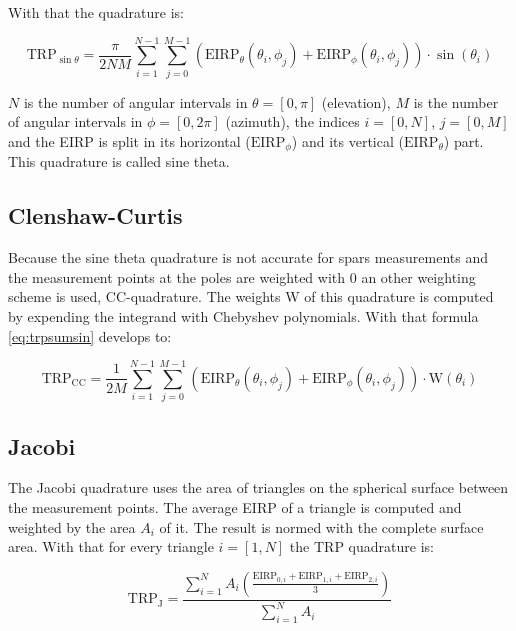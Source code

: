 With that the quadrature is:

\begin{equation}
\text{TRP}_{\sin\theta} = \frac{\pi}{2NM}\sum^{N-1}_{i=1}\sum^{M-1}_{j=0}\left(\text{EIRP}_\theta\left(\theta_i,\phi_j\right)+\text{EIRP}_\phi\left(\theta_i,\phi_j\right)\right)\cdot\sin\left(\theta_i\right)
\label{eq:trpsumsin}
\end{equation}

$N$ is the number of angular intervals in $\theta=\left[0,\pi\right]$ (elevation), $M$ is the number of angular intervals in $\phi=\left[0,2\pi\right]$ (azimuth), the indices $i=\left[0,N\right]$, $j=\left[0,M\right]$ and the \ac{EIRP} is split in its horizontal ($\text{EIRP}_\phi$) and its vertical ($\text{EIRP}_\theta$) part. This quadrature is called sine theta.

\subsection{Clenshaw-Curtis}

Because the sine theta quadrature is not accurate for spars measurements and the measurement points at the poles are weighted with $0$ an other weighting scheme is used, \ac{CC}-quadrature. The weights W of this quadrature is computed by expending the integrand with Chebyshev polynomials. With that formula \ref{eq:trpsumsin} develops to: \cite{trp}

\begin{equation}
\text{TRP}_{\text{CC}} = \frac{1}{2M}\sum^{N-1}_{i=1}\sum^{M-1}_{j=0}\left(\text{EIRP}_\theta\left(\theta_i,\phi_j\right)+\text{EIRP}_\phi\left(\theta_i,\phi_j\right)\right)\cdot\text{W}\left(\theta_i\right)
\label{eq:trpsumcc}
\end{equation}

\subsection{Jacobi}

The Jacobi quadrature uses the area of triangles on the spherical surface between the measurement points. The average \ac{EIRP} of a triangle is computed and weighted by the area $A_i$ of it. The result is normed with the complete surface area. With that for every triangle $i=\left[1,N\right]$ the \ac{TRP} quadrature is: \cite{trp}

\begin{equation}
\text{TRP}_{\text{J}} = \frac{\sum^N_{i=1}A_i\left(\frac{\text{EIRP}_{0,i}+\text{EIRP}_{1,i}+\text{EIRP}_{2,i}}{3}\right)}{\sum^N_{i=1}A_i}
\end{equation}

